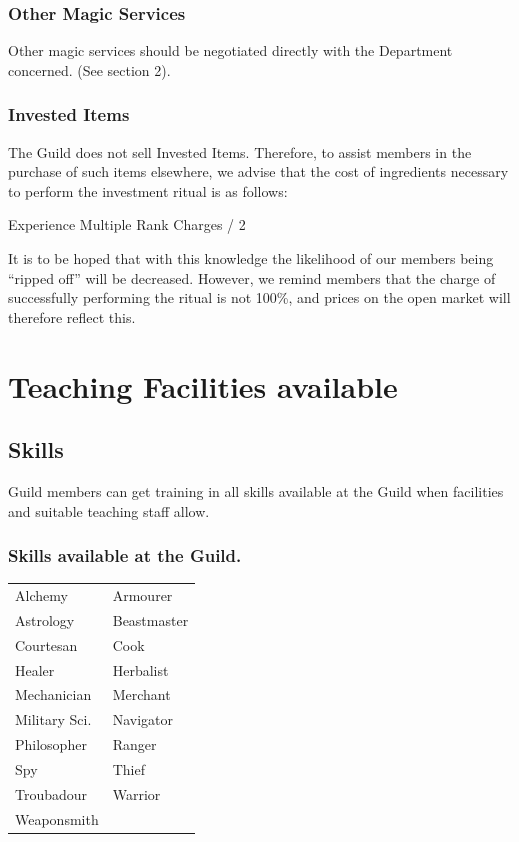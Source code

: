 \documentclass[twoside,a4paper]{article}
\begin{document}
\begin{multicols}{2}
\subsubsection{Other Magic Services}

Other magic services should be negotiated directly with the Department
concerned. (See section 2).

\subsubsection{Invested Items}

The Guild does not sell Invested Items.  Therefore, to assist members
in the purchase of such items elsewhere, we advise that the cost of
ingredients necessary to perform the investment ritual is as follows:
\begin{flushleft}
Experience Multiple  \x  Rank  \x  Charges / 2
\end{flushleft}
It is to be hoped that with this knowledge the likelihood of our
members being ``ripped off'' will be decreased. However, we remind
members that the charge of successfully performing the ritual is not
100\%, and prices on the open market will therefore reflect this.


\raggedcolumns

\pagebreak

%
%


\section{Teaching Facilities available}

\subsection{Skills}

Guild members can get training in all skills available at the Guild
when facilities and suitable teaching staff allow.

\subsubsection{Skills available at the Guild.}

\begin{tabular}{ll}
Alchemy		& Armourer \\
Astrology	& Beastmaster \\
Courtesan	& Cook \\
Healer		& Herbalist \\
Mechanician	& Merchant \\
Military Sci.	& Navigator \\
Philosopher	& Ranger \\
Spy		& Thief \\
Troubadour	& Warrior \\
Weaponsmith \\
\end{tabular}


\end{multicols}
\end{document}
